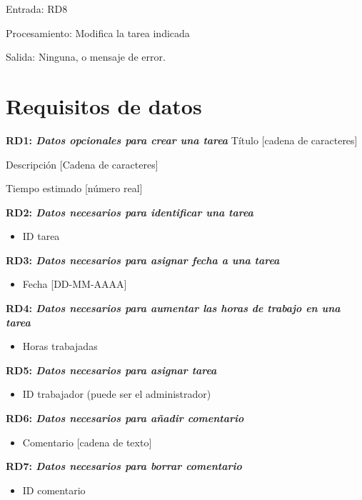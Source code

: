 \documentclass[paper=a4, fontsize=11pt, spanish]{scrartcl}
\begin{document}
Entrada: RD8

Procesamiento: Modifica la tarea indicada

Salida: Ninguna, o mensaje de error.

\section{Requisitos de datos}
\setlength{\parindent}{0em}
\textbf{RD1: \textit{Datos opcionales para crear una tarea}}
\setlength{\parindent}{2em}
Título [cadena de caracteres]

Descripción [Cadena de caracteres]

Tiempo estimado [número real]

\setlength{\parindent}{0em}
\textbf{RD2: \textit{Datos necesarios para identificar una tarea}}
\setlength{\parindent}{2em}
\begin{itemize}
\item ID tarea
\end{itemize}

\setlength{\parindent}{0em}
\textbf{RD3: \textit{Datos necesarios para asignar fecha a una tarea}}
\setlength{\parindent}{2em}
\begin{itemize}
\item Fecha [DD-MM-AAAA]
\end{itemize}

\setlength{\parindent}{0em}
\textbf{RD4: \textit{Datos necesarios para aumentar las horas de trabajo en una tarea}}
\setlength{\parindent}{2em}
\begin{itemize}
\item Horas trabajadas
\end{itemize}

\setlength{\parindent}{0em}
\textbf{RD5: \textit{Datos necesarios para asignar tarea}}
\setlength{\parindent}{2em}
\begin{itemize}
\item ID trabajador (puede ser el administrador)
\end{itemize}

\setlength{\parindent}{0em}
\textbf{RD6: \textit{Datos necesarios para añadir comentario}}
\setlength{\parindent}{2em}
\begin{itemize}
\item Comentario [cadena de texto]
\end{itemize}

\setlength{\parindent}{0em}
\textbf{RD7: \textit{Datos necesarios para borrar comentario}}
\setlength{\parindent}{2em}
\begin{itemize}
\item ID comentario
\end{itemize}
\end{document}

